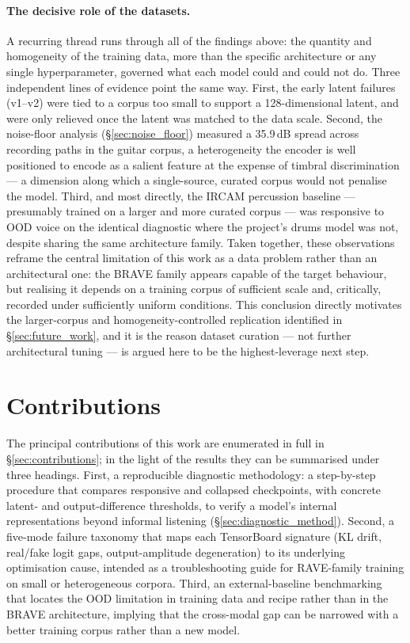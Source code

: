 \documentclass[a4paper,11pt,oneside,openany]{book}
\begin{document}
\paragraph{The decisive role of the datasets.} A recurring thread runs through all of the findings above: the quantity and homogeneity of the training data, more than the specific architecture or any single hyperparameter, governed what each model could and could not do. Three independent lines of evidence point the same way. First, the early latent failures (v1--v2) were tied to a corpus too small to support a 128-dimensional latent, and were only relieved once the latent was matched to the data scale. Second, the noise-floor analysis (\S\ref{sec:noise_floor}) measured a 35.9\,dB spread across recording paths in the guitar corpus, a heterogeneity the encoder is well positioned to encode as a salient feature at the expense of timbral discrimination --- a dimension along which a single-source, curated corpus would not penalise the model. Third, and most directly, the IRCAM percussion baseline --- presumably trained on a larger and more curated corpus --- was responsive to OOD voice on the identical diagnostic where the project's drums model was not, despite sharing the same architecture family. Taken together, these observations reframe the central limitation of this work as a data problem rather than an architectural one: the BRAVE family appears capable of the target behaviour, but realising it depends on a training corpus of sufficient scale and, critically, recorded under sufficiently uniform conditions. This conclusion directly motivates the larger-corpus and homogeneity-controlled replication identified in \S\ref{sec:future_work}, and it is the reason dataset curation --- not further architectural tuning --- is argued here to be the highest-leverage next step.

\section{Contributions}\label{sec:contributions_summary}

The principal contributions of this work are enumerated in full in \S\ref{sec:contributions}; in the light of the results they can be summarised under three headings. First, a reproducible diagnostic methodology: a step-by-step procedure that compares responsive and collapsed checkpoints, with concrete latent- and output-difference thresholds, to verify a model's internal representations beyond informal listening (\S\ref{sec:diagnostic_method}). Second, a five-mode failure taxonomy that maps each TensorBoard signature (KL drift, real/fake logit gaps, output-amplitude degeneration) to its underlying optimisation cause, intended as a troubleshooting guide for RAVE-family training on small or heterogeneous corpora. Third, an external-baseline benchmarking that locates the OOD limitation in training data and recipe rather than in the BRAVE architecture, implying that the cross-modal gap can be narrowed with a better training corpus rather than a new model.
\end{document}
